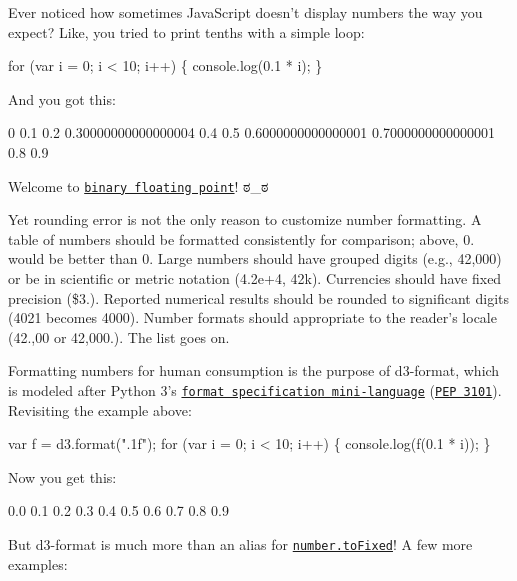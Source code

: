 Ever noticed how sometimes Java\+Script doesn’t display numbers the way you expect? Like, you tried to print tenths with a simple loop\+:


\begin{DoxyCode}
for (var i = 0; i < 10; i++) \{
  console.log(0.1 * i);
\}
\end{DoxyCode}


And you got this\+:


\begin{DoxyCode}
0
0.1
0.2
0.30000000000000004
0.4
0.5
0.6000000000000001
0.7000000000000001
0.8
0.9
\end{DoxyCode}


Welcome to \href{https://en.wikipedia.org/wiki/Double-precision_floating-point_format}{\tt binary floating point}! ಠ\+\_\+ಠ

Yet rounding error is not the only reason to customize number formatting. A table of numbers should be formatted consistently for comparison; above, 0. would be better than 0. Large numbers should have grouped digits (e.\+g., 42,000) or be in scientific or metric notation (4.\+2e+4, 42k). Currencies should have fixed precision (\$3.). Reported numerical results should be rounded to significant digits (4021 becomes 4000). Number formats should appropriate to the reader’s locale (42.,00 or 42,000.). The list goes on.

Formatting numbers for human consumption is the purpose of d3-\/format, which is modeled after Python 3’s \href{https://docs.python.org/3/library/string.html#format-specification-mini-language}{\tt format specification mini-\/language} (\href{https://www.python.org/dev/peps/pep-3101/}{\tt P\+EP 3101}). Revisiting the example above\+:


\begin{DoxyCode}
var f = d3.format(".1f");
for (var i = 0; i < 10; i++) \{
  console.log(f(0.1 * i));
\}
\end{DoxyCode}


Now you get this\+:


\begin{DoxyCode}
0.0
0.1
0.2
0.3
0.4
0.5
0.6
0.7
0.8
0.9
\end{DoxyCode}


But d3-\/format is much more than an alias for \href{https://developer.mozilla.org/en-US/docs/Web/JavaScript/Reference/Global_Objects/Number/toFixed}{\tt number.\+to\+Fixed}! A few more examples\+:




